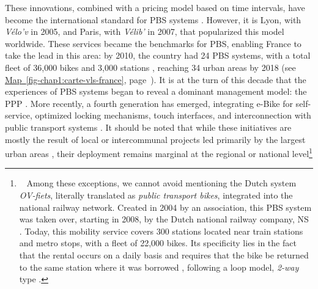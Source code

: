 \begin{refsegment}
These innovations, combined with a pricing model based on time intervals, have become the international standard for \acrshort{PBS} systems \textcolor{blue}{\autocite[162]{shaheen_bikesharing_2010}}. However, it is Lyon, with \textsl{Vélo'v} in 2005, and Paris, with \textsl{Vélib'} in 2007, that popularized this model worldwide. These services became the benchmarks for \acrshort{PBS}, enabling France to take the lead in this area: by 2010, the country had 24 \acrshort{PBS} systems, with a total fleet of 36,000 bikes and 3,000 stations \textcolor{blue}{\autocite[161]{shaheen_bikesharing_2010}}, reaching 34 urban areas by 2018 (see \hyperref[fig-chap1:carte-vls-france]{Map~\ref{fig-chap1:carte-vls-france}}, page~\pageref{fig-chap1:carte-vls-france}). It is at the turn of this decade that the experiences of \acrshort{PBS} systems began to reveal a dominant management model: the \acrfull{PPP} \textcolor{blue}{\autocite[5]{hure_entre_2014}}. More recently, a fourth generation has emerged, integrating \acrshort{e-Bike} for self-service, optimized locking mechanisms, touch interfaces, and interconnection with public transport systems \textcolor{blue}{\autocite[162]{shaheen_bikesharing_2010}}. It should be noted that while these initiatives are mostly the result of local or intercommunal projects led primarily by the largest urban areas \textcolor{blue}{\autocites[18]{fishman_bike_2013}[6]{ricci_bike_2015}}, their deployment remains marginal at the regional or national level\footnote{~
    Among these exceptions, we cannot avoid mentioning the Dutch system \textsl{OV-fiets}, literally translated as \textsl{public transport bikes}, integrated into the national railway network. Created in 2004 by an association, this \acrshort{PBS} system was taken over, starting in 2008, by the Dutch national railway company, \acrfull{NS} \textcolor{blue}{\autocites[151]{ploeger_sociotechnical_2020}[157]{waes_why_2020}}. Today, this mobility service covers 300 stations located near train stations and metro stops, with a fleet of 22,000 bikes. Its specificity lies in the fact that the rental occurs on a daily basis and requires that the bike be returned to the same station where it was borrowed \textcolor{blue}{\autocite[9]{ploeger_sociotechnical_2020}}, following a loop model, \textsl{2-way} type \textcolor{blue}{\autocite[13]{mangeart_vehicules_2022}}.
}
\end{refsegment}
